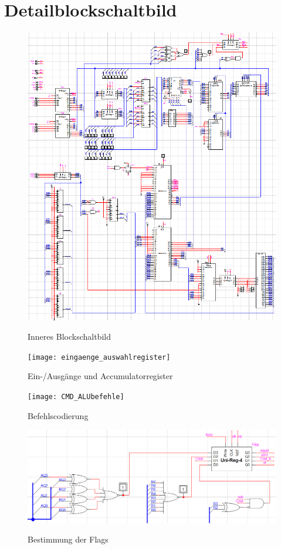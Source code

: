 \documentclass[11pt]{report}
\begin{document}
	\section{Detailblockschaltbild}
	\begin{figure}[htbp]
		\begin{center}
			\includegraphics[width=\textwidth]{inneresBlockschaltbild}
			\label{inneresBlockschaltbild}
			\caption{Inneres Blockschaltbild}
		\end{center}
	\end{figure}
	
	\begin{figure}[htbp]
		\begin{center}
			\texttt{[image: eingaenge\_auswahlregister]}
			\label{eingaenge_auswahlregister}
			\caption{Ein-/Ausgänge und Accumulatorregister}
		\end{center}
	\end{figure}
	
	\begin{figure}[htbp]
		\begin{center}
			\texttt{[image: CMD\_ALUbefehle]}
			\label{CMD_ALUbefehle}
			\caption{Befehlscodierung}
		\end{center}
	\end{figure}
	
	\begin{figure}[htbp]
		\begin{center}
			\includegraphics[width=\textwidth]{flagregister}
			\label{flagregister}
			\caption{Bestimmung der Flags}
		\end{center}
	\end{figure}
	
\end{document}
